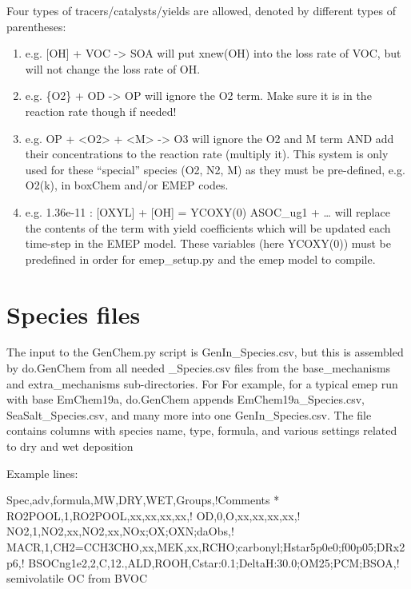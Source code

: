 \documentclass[a4paper,10pt,english]{sphinxmanual}
\begin{document}
Four  types of tracers/catalysts/yields are allowed, denoted by different types of parentheses:
\begin{enumerate}
\def\theenumi{\arabic{enumi}}
\def\labelenumi{\theenumi )}
\makeatletter\def\p@enumii{\p@enumi \theenumi )}\makeatother
\item {} 
e.g. {[}OH{]} + VOC -\textgreater{} SOA   will put xnew(OH) into the loss rate of VOC, but will not change the loss rate of OH.

\item {} 
e.g. \{O2\} + OD -\textgreater{} OP   will ignore the O2 term. Make sure it is in the reaction rate though if needed!

\item {} 
e.g. OP + \textless{}O2\textgreater{} + \textless{}M\textgreater{} -\textgreater{} O3  will ignore the O2 and M term AND add their concentrations to the reaction rate (multiply it). This system is only used for these “special” species (O2, N2, M) as they must be pre-defined, e.g. O2(k), in boxChem and/or EMEP codes.

\item {} 
e.g. 1.36e-11 :   {[}OXYL{]} + {[}OH{]} = \textbar{}YCOXY(0)\textbar{}  ASOC\_ug1  + …  will replace the contents of the \textbar{}\textbar{} term with yield coefficients which will be updated each time-step in the EMEP model.  These variables (here YCOXY(0)) must be predefined in order for emep\_setup.py and the emep model to compile.

\end{enumerate}


\section{Species files}
\label{\detokenize{GenChemDoc_chem:species-files}}
The input to the GenChem.py script is GenIn\_Species.csv, but this
is assembled by do.GenChem from all needed  \_Species.csv files from
the base\_mechanisms and extra\_mechanisms sub-directories. For For
example, for a typical emep run with base EmChem19a, do.GenChem
appends EmChem19a\_Species.csv, SeaSalt\_Species.csv, and many more into
one GenIn\_Species.csv. The file contains columns with species
name, type, formula, and various settings related to dry and wet deposition

Example lines:

\begin{sphinxVerbatim}[commandchars=\\\{\}]
Spec,adv,formula,MW,DRY,WET,Groups,!Comments
*
RO2POOL,1,RO2POOL,xx,xx,xx,xx,!
OD,0,O,xx,xx,xx,xx,!
NO2,1,NO2,xx,NO2,xx,NOx;OX;OXN;daObs,!
MACR,1,CH2=CCH3CHO,xx,MEK,xx,RCHO;carbonyl;Hstar\PYGZus{}5p0e0;f0\PYGZus{}0p05;DRx\PYGZus{}2p6,!
BSOC\PYGZus{}ng1e2,2,C,12.,ALD,ROOH,Cstar:0.1;DeltaH:30.0;OM25;PCM;BSOA,\PYGZdq{}! semi\PYGZhy{}volatile OC from BVOC \PYGZdq{}
\end{sphinxVerbatim}
\end{document}
